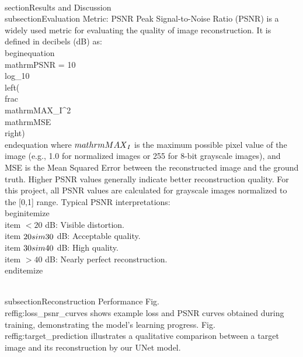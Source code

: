 \documentclass[10pt,journal]{IEEEtran} %
\begin{document}
\\section{Results and Discussion}
\\subsection{Evaluation Metric: PSNR}
Peak Signal-to-Noise Ratio (PSNR) is a widely used metric for evaluating the quality of image reconstruction. It is defined in decibels (dB) as:
\\begin{equation}
\\mathrm{PSNR} = 10 \\log_{10}\\left(\\frac{\\mathrm{MAX}_I^2}{\\mathrm{MSE}}\\right)
\\end{equation}
where $\\mathrm{MAX}_I$ is the maximum possible pixel value of the image (e.g., 1.0 for normalized images or 255 for 8-bit grayscale images), and MSE is the Mean Squared Error between the reconstructed image and the ground truth. Higher PSNR values generally indicate better reconstruction quality. For this project, all PSNR values are calculated for grayscale images normalized to the [0,1] range.
Typical PSNR interpretations:
\\begin{itemize}
    \\item $<20$ dB: Visible distortion.
    \\item $20\\sim30$ dB: Acceptable quality.
    \\item $30\\sim40$ dB: High quality.
    \\item $>40$ dB: Nearly perfect reconstruction.
\\end{itemize}

\\subsection{Reconstruction Performance}
Fig. \\ref{fig:loss_psnr_curves} shows example loss and PSNR curves obtained during training, demonstrating the model's learning progress. Fig. \\ref{fig:target_prediction} illustrates a qualitative comparison between a target image and its reconstruction by our UNet model.
\end{document}
